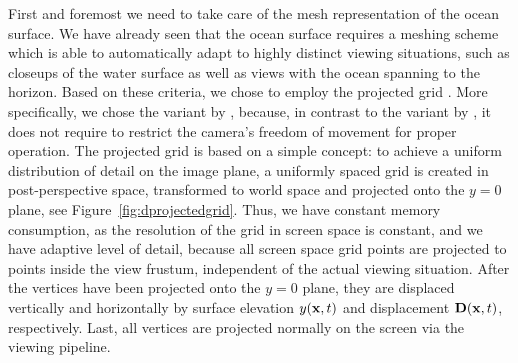 First and foremost we need to take care of the mesh representation of the ocean
surface.
We have already seen that the ocean surface requires a meshing scheme which is
able to automatically adapt to highly distinct viewing situations, such as
closeups of the water surface as well as views with the ocean spanning to the
horizon.
\textcolor{changed}{
Based on these criteria, we chose to employ the projected grid
\citep{Hinsinger:2002,thesis:johanson}. More specifically, we chose the
variant by \citet{thesis:johanson}, because, in contrast to the variant
by \citet{Hinsinger:2002}, it does not require to restrict the camera's
freedom of movement for proper operation.}
The projected grid is based on a
simple concept: to achieve a uniform distribution of detail on the image plane,
a uniformly spaced grid is created in post-perspective space, transformed to
world space and projected onto the $y=0$ plane, see
Figure~\ref{fig:dprojectedgrid}.
Thus, we have constant memory consumption, as the resolution of the grid in
screen space is constant, and we have adaptive level of detail, because all
screen space grid points are projected to points inside the view frustum,
independent of the actual viewing situation. After the vertices have been
projected onto the $y=0$ plane, they are displaced vertically and horizontally
by surface elevation $y(\mathbf{x},t)$ and displacement $\mathbf{D}(\mathbf{x},t)$,
respectively. Last, all vertices are projected normally on the screen via the
viewing pipeline.
%
